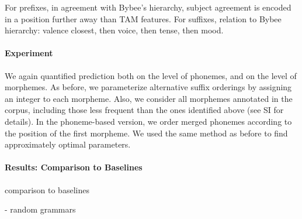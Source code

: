 For prefixes, in agreement with Bybee's hierarchy, subject agreement is encoded in a position further away than TAM features.
For suffixes, relation to Bybee hierarchy: valence closest, then voice, then tense, then mood.




\paragraph{Experiment}
We again quantified prediction both on the level of phonemes, and on the level of morphemes.
As before, we parameterize alternative suffix orderings by assigning an integer to each morpheme.
Also, we consider all morphemes annotated in the corpus, including those less frequent than the ones identified above (see SI for details).
In the phoneme-based version, we order merged phonemes according to the position of the first morpheme.
We used the same method as before to find approximately optimal parameters.

\paragraph{Results: Comparison to Baselines}
comparison to baselines

- random grammars



